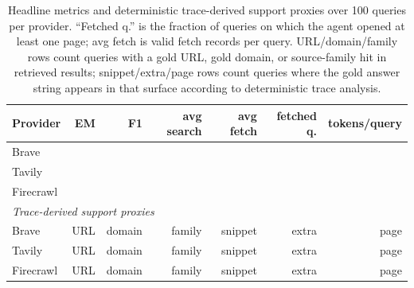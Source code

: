 \begin{table}[t]
\centering
\small
\begin{tabular}{lrrrrrr}
\toprule
\textbf{Provider} & \textbf{EM} & \textbf{F1} & \textbf{avg search} & \textbf{avg fetch} & \textbf{fetched q.} & \textbf{tokens/query} \\
\midrule
Brave & \BraveEM{} & \BraveFone{} & \BraveSearchAvg{} & \BraveFetchAvg{} & \BraveFetchedPct{} & \BraveAvgTokens{} \\
Tavily & \TavilyEM{} & \TavilyFone{} & \TavilySearchAvg{} & \TavilyFetchAvg{} & \TavilyFetchedPct{} & \TavilyAvgTokens{} \\
Firecrawl & \FirecrawlEM{} & \FirecrawlFone{} & \FirecrawlSearchAvg{} & \FirecrawlFetchAvg{} & \FirecrawlFetchedPct{} & \FirecrawlAvgTokens{} \\
\midrule
\multicolumn{7}{l}{\emph{Trace-derived support proxies}} \\
Brave & \multicolumn{1}{r}{URL \BraveGoldURLExact{}} & \multicolumn{1}{r}{domain \BraveGoldDomain{}} & \multicolumn{1}{r}{family \BraveGoldFamily{}} & \multicolumn{1}{r}{snippet \BraveAnswerSnippet{}} & \multicolumn{1}{r}{extra \BraveAnswerExtra{}} & \multicolumn{1}{r}{page \BraveAnswerPage{}} \\
Tavily & \multicolumn{1}{r}{URL \TavilyGoldURLExact{}} & \multicolumn{1}{r}{domain \TavilyGoldDomain{}} & \multicolumn{1}{r}{family \TavilyGoldFamily{}} & \multicolumn{1}{r}{snippet \TavilyAnswerSnippet{}} & \multicolumn{1}{r}{extra \TavilyAnswerExtra{}} & \multicolumn{1}{r}{page \TavilyAnswerPage{}} \\
Firecrawl & \multicolumn{1}{r}{URL \FirecrawlGoldURLExact{}} & \multicolumn{1}{r}{domain \FirecrawlGoldDomain{}} & \multicolumn{1}{r}{family \FirecrawlGoldFamily{}} & \multicolumn{1}{r}{snippet \FirecrawlAnswerSnippet{}} & \multicolumn{1}{r}{extra \FirecrawlAnswerExtra{}} & \multicolumn{1}{r}{page \FirecrawlAnswerPage{}} \\
\bottomrule
\end{tabular}
\caption{Headline metrics and deterministic trace-derived support proxies over 100 queries per provider. ``Fetched q.'' is the fraction of queries on which the agent opened at least one page; avg fetch is valid fetch records per query. URL/domain/family rows count queries with a gold URL, gold domain, or source-family hit in retrieved results; snippet/extra/page rows count queries where the gold answer string appears in that surface according to deterministic trace analysis.}
\label{tab:headline}
\end{table}

